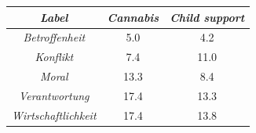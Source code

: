 \begin{tabular}{c c c}
      \hline
      \textit{Label} & \textit{Cannabis} & \textit{Child support} \\
      \hline
      \textit{Betroffenheit} & 5.0 & 4.2 \\
      \textit{Konflikt} & 7.4 & 11.0 \\
      \textit{Moral} & 13.3 & 8.4 \\
      \textit{Verantwortung} & 17.4 & 13.3 \\
      \textit{Wirtschaftlichkeit} & 17.4 & 13.8 \\
      \hline
    \end{tabular}